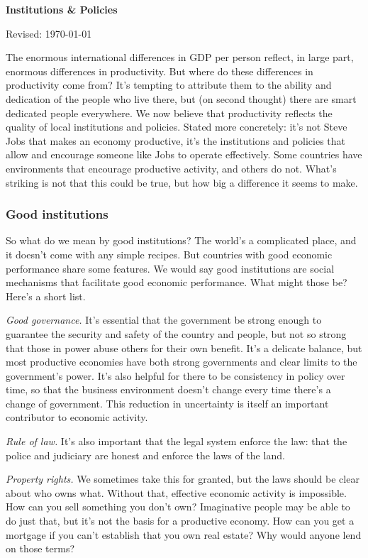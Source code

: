 \documentclass[letterpaper,12pt]{article}
\begin{document}
\thispagestyle{empty}%
\Head

\centerline{\large \bf Institutions \& Policies}%
\centerline{Revised:  \today}

\bigskip
The enormous international differences in GDP per person
reflect, in large part, enormous differences in
productivity.
But where do these differences in productivity come from?
It's tempting to attribute them to the ability and dedication
of the people who live there,
but (on second thought) there are smart dedicated people everywhere.
We now believe that productivity reflects
the quality of local institutions and policies.
Stated more concretely:
it's not Steve Jobs that makes an economy productive,
it's the institutions and policies that allow and encourage someone like Jobs to
operate effectively.
Some countries have environments that encourage productive
activity, and others do not.
What's striking is not that this could be true,
but how big a difference it seems to make.


\subsubsection*{Good institutions}

So what do we mean by good institutions?
The world's a complicated place, and it doesn't come
with any simple recipes.
But countries with good economic performance
 share some features.
We would say good institutions are social mechanisms
that facilitate good economic performance.
What might those be?
Here's a short list.

{\it Good governance.\/}
It's essential that the government be strong enough
to guarantee the security and safety of the country
and people,
but not so strong that those in power abuse others for their own benefit.
It's a delicate balance,
but most productive economies have both strong governments
and clear limits to the government's power.
It's also helpful for there to be consistency in policy over time,
so that the business environment doesn't change every time
there's a change of government.
This reduction in uncertainty is itself an important
contributor to economic activity.

{\it Rule of law.\/}
It's also important that the legal system enforce the law:
that the police and judiciary are honest and
enforce the laws of the land.

{\it Property rights.\/}
We sometimes take this for granted,
but the laws should be clear about who owns what.
Without that, effective economic activity is impossible.
How can you sell something you don't own?
Imaginative people may be able to do just that,
but it's not the basis for a productive economy.
How can you get a mortgage if you can't establish
that you own real estate?
Why would anyone lend on those terms?
\end{document}
